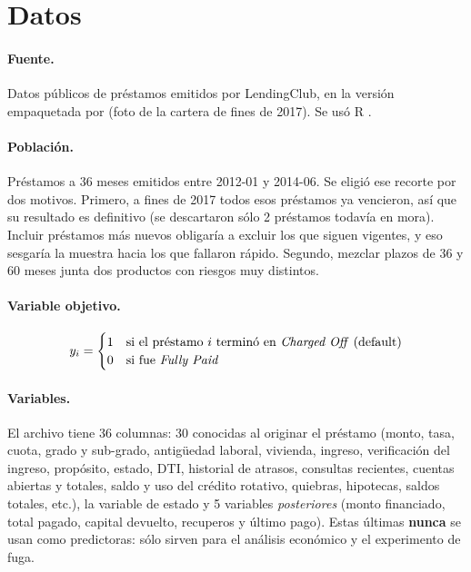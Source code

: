 \documentclass{article}
\begin{document}
\section{Datos}
\label{sec:datos}

\paragraph{Fuente.} Datos públicos de préstamos emitidos por LendingClub, en la
versión empaquetada por \citet{kuhn2017data} (foto de la cartera de fines de
2017). Se usó R \cite{rcore2023}.

\paragraph{Población.} Préstamos a 36 meses emitidos entre 2012-01 y 2014-06. Se
eligió ese recorte por dos motivos. Primero, a fines de 2017 todos esos préstamos
ya vencieron, así que su resultado es definitivo (se descartaron sólo 2 préstamos
todavía en mora). Incluir préstamos más nuevos obligaría a excluir los que siguen
vigentes, y eso sesgaría la muestra hacia los que fallaron rápido. Segundo, mezclar
plazos de 36 y 60 meses junta dos productos con riesgos muy distintos.

\paragraph{Variable objetivo.}
\begin{equation}
y_i = \begin{cases} 1 & \text{si el préstamo } i \text{ terminó en \emph{Charged Off} (default)} \\
0 & \text{si fue \emph{Fully Paid}} \end{cases}
\end{equation}

\paragraph{Variables.} El archivo tiene 36 columnas: 30 conocidas al originar el
préstamo (monto, tasa, cuota, grado y sub-grado, antigüedad laboral, vivienda,
ingreso, verificación del ingreso, propósito, estado, DTI, historial de atrasos,
consultas recientes, cuentas abiertas y totales, saldo y uso del crédito
rotativo, quiebras, hipotecas, saldos totales, etc.), la variable de estado y 5
variables \emph{posteriores} (monto financiado, total pagado, capital devuelto,
recuperos y último pago). Estas últimas \textbf{nunca} se usan como predictoras:
sólo sirven para el análisis económico y el experimento de fuga.
\end{document}
